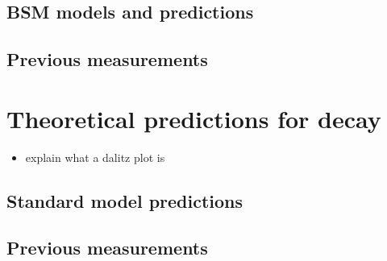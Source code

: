 \subsection{BSM models and predictions}
\subsection{Previous measurements}

\section{Theoretical predictions for \decay{\Bp}{\Dsp\Kp\Km} decay}

{\color{Red}
\begin{itemize}
\item explain what a dalitz plot is
\end{itemize}
}

\subsection{Standard model predictions}
\subsection{Previous measurements}



